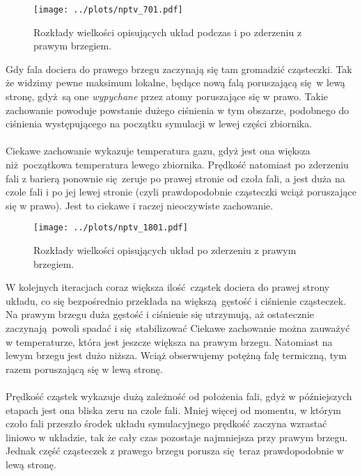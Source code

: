 \documentclass[a4paper, 12pt]{article}
\begin{document}
	\begin{figure}[H]
	\centering
		\texttt{[image: ../plots/nptv\_701.pdf]}
		\caption{Rozkłady wielkości opisujących układ podczas i po zderzeniu z prawym brzegiem.}
		\label{nptv_2}
	\end{figure}

	\noindent Gdy fala dociera do prawego brzegu zaczynają się tam gromadzić cząsteczki. 
	Tak że widzimy pewne maksimum lokalne, będące nową falą poruszającą się w lewą stronę, gdyż są one \textit{wypychane} przez atomy poruszające się w prawo.
	Takie zachowanie powoduje powstanie dużego ciśnienia w tym obszarze, podobnego do ciśnienia występującego na początku symulacji w lewej części zbiornika.
	\\
	\\
	Ciekawe zachowanie wykazuje temperatura gazu, gdyż jest ona większa niż początkowa temperatura lewego zbiornika. 
	Prędkość natomiast po zderzeniu fali z barierą ponownie się zeruje po prawej stronie od czoła fali, a jest duża na czole fali i po jej lewej stronie (czyli prawdopodobnie cząsteczki wciąż poruszające się w prawo). 
	Jest to ciekawe i raczej nieoczywiste zachowanie. 

	\begin{figure}[H]
		\centering
		\texttt{[image: ../plots/nptv\_1801.pdf]}
		\caption{Rozkłady wielkości opisujących układ po zderzeniu z prawym brzegiem.}
		\label{nptv_3}
	\end{figure}
	
	\noindent W kolejnych iteracjach coraz większa ilość cząstek dociera do prawej strony układu, co się bezpośrednio przekłada na większą gęstość i ciśnienie cząsteczek. 
	Na prawym brzegu duża gęstość i ciśnienie się utrzymują, aż ostatecznie zaczynają powoli spadać i się stabilizować
	Ciekawe zachowanie można zauważyć w temperaturze, która jest jeszcze większa na prawym brzegu. 
	Natomiast na lewym brzegu jest dużo niższa.
	Wciąż obserwujemy potężną falę termiczną, tym razem poruszającą się w lewą stronę. 
	\\
	\\
	Prędkość cząstek wykazuje dużą zależność od położenia fali, gdyż w późniejszych etapach jest ona bliska zeru na czole fali.
	Mniej więcej od momentu, w którym czoło fali przeszło środek układu symulacyjnego prędkość zaczyna wzrastać liniowo w układzie, tak że cały czas pozostaje najmniejsza przy prawym brzegu.
	Jednak część cząsteczek z prawego brzegu porusza się teraz prawdopodobnie w lewą stronę. 
	
\end{document}

